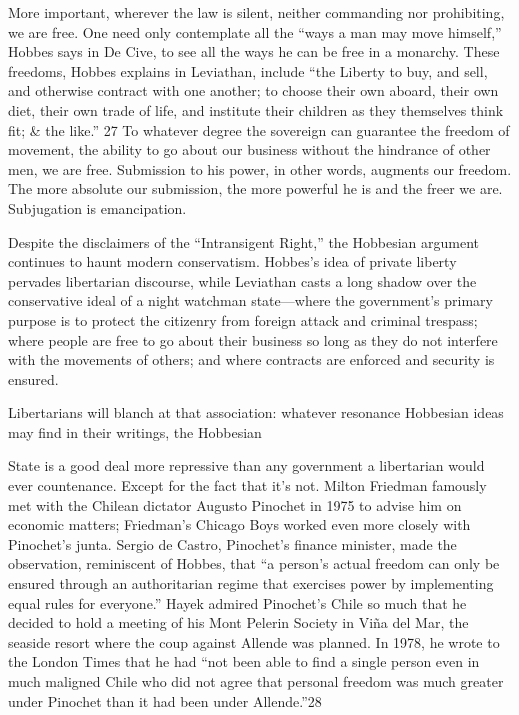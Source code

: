 \par 
More important, wherever the law is silent, neither commanding nor prohibiting, we are free. One need only contemplate all the “ways a man may move himself,” Hobbes says in De Cive, to see all the ways he can be free in a monarchy. These freedoms, Hobbes explains in Leviathan, include “the Liberty to buy, and sell, and otherwise contract with one another; to choose their own aboard, their own diet, their own trade of life, and institute their children as they themselves think fit; & the like.” {\color{blue}27} To whatever degree the sovereign can guarantee the freedom of movement, the ability to go about our business without the hindrance of other men, we are free. Submission to his power, in other words, augments our freedom. The more absolute our submission, the more powerful he is and the freer we are. Subjugation is emancipation.
 \par 
Despite the disclaimers of the “Intransigent Right,” the Hobbesian argument continues to haunt modern conservatism. Hobbes’s idea of private liberty pervades libertarian discourse, while Leviathan casts a long shadow over the conservative ideal of a night watchman state—where the government’s primary purpose is to protect the citizenry from foreign attack and criminal trespass; where people are free to go about their business so long as they do not interfere with the movements of others; and where contracts are enforced and security is ensured.
 \par 
Libertarians will blanch at that association: whatever resonance Hobbesian ideas may find in their writings, the Hobbesian
 \par 
State is a good deal more repressive than any government a libertarian would ever countenance. Except for the fact that it’s not. Milton Friedman famously met with the Chilean dictator Augusto Pinochet in 1975 to advise him on economic matters; Friedman’s Chicago Boys worked even more closely with Pinochet’s junta. Sergio de Castro, Pinochet’s finance minister, made the observation, reminiscent of Hobbes, that “a person’s actual freedom can only be ensured through an authoritarian regime that exercises power by implementing equal rules for everyone.” Hayek admired Pinochet’s Chile so much that he decided to hold a meeting of his Mont Pelerin Society in Viña del Mar, the seaside resort where the coup against Allende was planned. In 1978, he wrote to the London Times that he had “not been able to find a single person even in much maligned Chile who did not agree that personal freedom was much greater under Pinochet than it had been under Allende.”{\color{blue}28}
